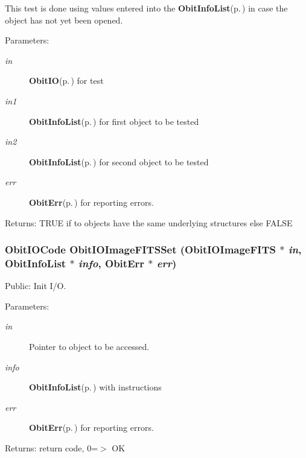 This test is done using values entered into the {\bf Obit\-Info\-List}{\rm (p.\,\pageref{structObitInfoList})} in case the object has not yet been opened. \begin{Desc}
\item[Parameters:]
\begin{description}
\item[{\em in}]{\bf Obit\-IO}{\rm (p.\,\pageref{structObitIO})} for test \item[{\em in1}]{\bf Obit\-Info\-List}{\rm (p.\,\pageref{structObitInfoList})} for first object to be tested \item[{\em in2}]{\bf Obit\-Info\-List}{\rm (p.\,\pageref{structObitInfoList})} for second object to be tested \item[{\em err}]{\bf Obit\-Err}{\rm (p.\,\pageref{structObitErr})} for reporting errors. \end{description}
\end{Desc}
\begin{Desc}
\item[Returns:]TRUE if to objects have the same underlying structures else FALSE \end{Desc}
\subsubsection{\setlength{\rightskip}{0pt plus 5cm}Obit\-IOCode Obit\-IOImage\-FITSSet ({\bf Obit\-IOImage\-FITS} $\ast$ {\em in}, {\bf Obit\-Info\-List} $\ast$ {\em info}, {\bf Obit\-Err} $\ast$ {\em err})}\label{ObitIOImageFITS_8c_a27}


Public: Init I/O. 

\begin{Desc}
\item[Parameters:]
\begin{description}
\item[{\em in}]Pointer to object to be accessed. \item[{\em info}]{\bf Obit\-Info\-List}{\rm (p.\,\pageref{structObitInfoList})} with instructions \item[{\em err}]{\bf Obit\-Err}{\rm (p.\,\pageref{structObitErr})} for reporting errors. \end{description}
\end{Desc}
\begin{Desc}
\item[Returns:]return code, 0=$>$ OK \end{Desc}
